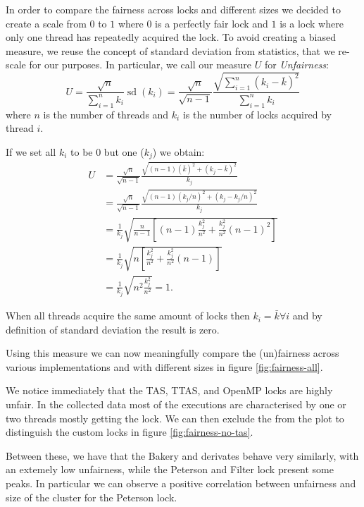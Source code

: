 In order to compare the fairness across locks and different sizes we decided to
create a scale from $0$ to $1$ where $0$ is a perfectly fair lock and $1$ is a
lock where only one thread has repeatedly acquired the lock.
To avoid creating a biased measure, we reuse the concept of standard deviation
from statistics, that we re-scale for our purposes.
In particular, we call our measure $U$ for \textit{Unfairness}:
$$
  U = \frac{\sqrt{n}}{\sum_{i = 1}^{n} k_i} \operatorname{sd}(k_i)
    = \frac{\sqrt{n}}{\sqrt{n-1}} \frac{\sqrt{\sum_{i = 1}^{n} (k_i - \bar{k})^2}}{\sum_{i = 1}^{n} k_i}
$$
where $n$ is the number of threads and $k_i$ is the number of locks acquired by thread $i$.

If we set all $k_i$ to be $0$ but one ($k_j$) we obtain:
\begin{align*}
  U &= \frac{\sqrt{n}}{\sqrt{n-1}} \frac{\sqrt{(n-1)(\bar{k})^2 + (k_j - \bar{k})^2}}{k_j} \\
    &= \frac{\sqrt{n}}{\sqrt{n-1}} \frac{\sqrt{(n-1)(k_j/n)^2 + (k_j - k_j/n)^2}}{k_j} \\
    &= \frac{1}{k_j} \sqrt{\frac{n}{n-1} \left[(n-1)\frac{k_j^2}{n^2} + \frac{k_j^2}{n^2}(n - 1)^2 \right]} \\
    &= \frac{1}{k_j} \sqrt{n \left[\frac{k_j^2}{n^2} + \frac{k_j^2}{n^2}(n - 1) \right]} \\
    &= \frac{1}{k_j} \sqrt{n^2\frac{k_j^2}{n^2}} = 1.
\end{align*}

When all threads acquire the same amount of locks then $k_i = \bar{k} \forall i$
and by definition of standard deviation the result is zero.

Using this measure we can now meaningfully compare the (un)fairness across
various implementations and with different sizes in figure \ref{fig:fairness-all}.

We notice immediately that the TAS, TTAS, and OpenMP locks are highly unfair.
In the collected data most of the executions are characterised by one or two
threads mostly getting the lock.
We can then exclude the from the plot to distinguish
the custom locks in figure \ref{fig:fairness-no-tas}.

Between these, we have that the Bakery and derivates behave very similarly, with
an extemely low unfairness, while the Peterson and Filter lock present some peaks.
In particular we can observe a positive correlation between unfairness and size of
the cluster for the Peterson lock.

